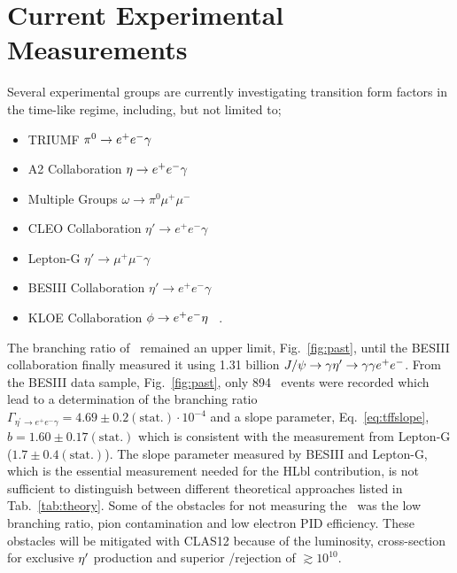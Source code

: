 \section{Current Experimental Measurements}\label{sec:current}
Several experimental groups are currently investigating transition form factors in the time-like regime, including, but not limited to;
\begin{itemize}
	\item TRIUMF $\pi^0 \to e^+e^- \gamma$~\cite{FARZ} 
	\item A2 Collaboration $\eta \to e^+e^- \gamma$~\cite{Berg,A2} 
	\item Multiple Groups $\omega\to\pi^0 \mu^+\mu^-$ ~\cite{Dzhelyadin:1980tj,Arnaldi:2009aa,Uras:2011zz}
	\item CLEO Collaboration $\eta'\to e^+e^-\gamma $~\cite{CLEO}
	\item Lepton-G $\eta'\to \mu^+\mu^-\gamma $~\cite{DZH}
	\item BESIII Collaboration $\eta'\to e^+e^-\gamma $~\cite{Ablikim:2015wnx}
	\item KLOE Collaboration $\phi \rightarrow e^+e^- \eta$~\cite{Babusci:2014ldz} .
\end{itemize}
The branching ratio of \etaPDal \ remained an upper limit, Fig.~\ref{fig:past}, until the BESIII collaboration finally measured it using 1.31 billion $J/\psi \to \gamma \eta^{\prime} \to \gamma \gamma e^+e^-$. From the BESIII data sample, Fig.~\ref{fig:past}, only 894 \etaPDal \ events were recorded which lead to a determination of the branching ratio $\Gamma_{\eta^{\prime} \rightarrow e^+e^- \gamma}  = 4.69 \pm 0.2 (\mathrm{stat.})\cdot 10^{-4}$ and a slope parameter, Eq.~\ref{eq:tffslope}, $b = 1.60\pm0.17(\mathrm{stat.})$ which is consistent with the measurement from Lepton-G ($1.7 \pm 0.4 (\mathrm{stat.})$). The slope parameter measured by BESIII and Lepton-G, which is the essential measurement needed for the HLbl contribution, is not sufficient to distinguish between different theoretical approaches listed in Tab.~\ref{tab:theory}. Some of the obstacles for not measuring the \etaPDal \ was the low branching ratio, pion contamination and low electron PID efficiency. These obstacles will be mitigated with CLAS12 because of the luminosity, cross-section for exclusive $\eta^{\prime}$ production and superior \epemT/\pipiT rejection of $\gtrsim 10^{10}$. 

